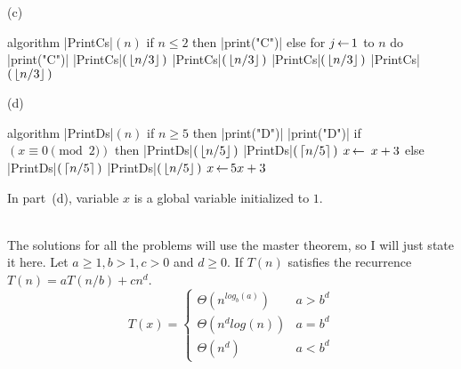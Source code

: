 \documentclass[11pt]{article}
\begin{document}
\begin{problem}
\medskip
\noindent
(c) 
\hspace{0.01in}
%
\begin{minipage}[t]{2.4in}
\strut\vspace*{- 2.5 \baselineskip}\newline 

\begin{program}
algorithm |PrintCs|$(n)$
   if $n\le 2$ then
      |print("C")|
   else
      for $j{\,\leftarrow\,} 1$ to $n$
         do |print("C")|
      |PrintCs|$(\,{\left\lfloor n/3\right\rfloor}\,)$
      |PrintCs|$(\,{\left\lfloor n/3\right\rfloor}\,)$
      |PrintCs|$(\,{\left\lfloor n/3\right\rfloor}\,)$
      |PrintCs|$(\,{\left\lfloor n/3\right\rfloor}\,)$
\end{program}
\end{minipage}
%
\hspace{0.4in}
(d) 
\hspace{0.01in}
%
\begin{minipage}[t]{2.4in}
\strut\vspace*{- 2.5 \baselineskip}\newline 

\begin{program}
algorithm |PrintDs|$(n)$  
   if $n\ge 5$ then
      |print("D")|
      |print("D")|
     if $(x \equiv 0 \pmod 2)$ then 
         |PrintDs|$(\,{\left\lfloor n/5\right\rfloor}\,)$
         |PrintDs|$(\,{\left\lceil n/5\right\rceil}\,)$
         $x{\,\leftarrow\,} \ x + 3$
      else
         |PrintDs|$(\,{\left\lceil n/5\right\rceil}\,)$
         |PrintDs|$(\,{\left\lfloor n/5\right\rfloor}\,)$
         $x{\,\leftarrow\,} 5x + 3$
\end{program}
\end{minipage}

\noindent
In part~(d), variable $x$ is a global variable initialized to $1$.
\end{problem}

\text{}\\
The solutions for all the problems will use the master theorem, so I will just state it here. Let $a \geq 1, b > 1, c > 0$ and $d \geq 0$. If $T(n)$ satisfies the recurrence $T(n) = aT(n/b) + cn^d$.
\[ T(x) = \begin{cases} 
   \Theta(n^{log_b{(a)}}) & a > b^d \\
   \Theta(n^dlog(n)) & a = b^d \\
   \Theta(n^d) & a < b^d 
\end{cases}
\]

\newpage
\end{document}
